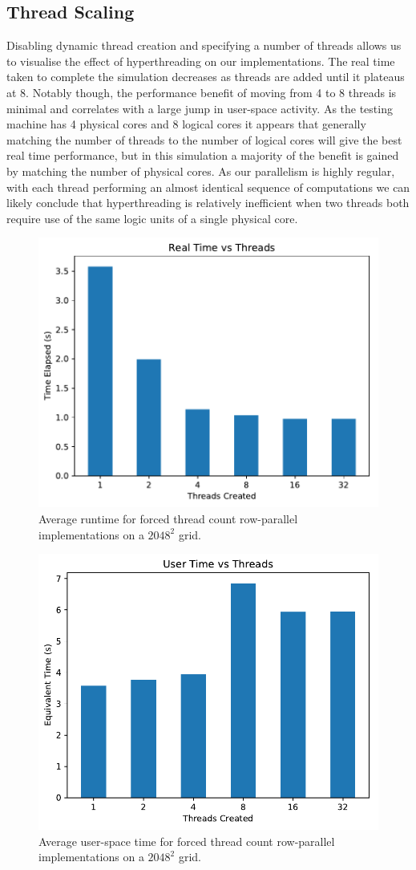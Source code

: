 \documentclass[]{article}
\begin{document}
\subsection{Thread Scaling}
Disabling dynamic thread creation and specifying a number of threads allows us to visualise the effect of hyperthreading on our implementations. The real time taken to complete the simulation decreases as threads are added until it plateaus at 8. Notably though, the performance benefit of moving from 4 to 8 threads is minimal and correlates with a large jump in user-space activity. As the testing machine has 4 physical cores and 8 logical cores it appears that generally matching the number of threads to the number of logical cores will give the best real time performance, but in this simulation a majority of the benefit is gained by matching the number of physical cores. As our parallelism is highly regular, with each thread performing an almost identical sequence of computations we can likely conclude that hyperthreading is relatively inefficient when two threads both require use of the same logic units of a single physical core.
\begin{figure}[p]
	\centering
	\includegraphics[width=.75\linewidth]{vecs/threads_realtime.pdf}
	\caption{Average runtime for forced thread count row-parallel implementations on a $2048^2$ grid.}
\end{figure}
\begin{figure}[p]
	\centering
	\includegraphics[width=.75\linewidth]{vecs/threads_usertime.pdf}
	\caption{Average user-space time for forced thread count row-parallel implementations on a $2048^2$ grid.}
\end{figure}
\end{document}
